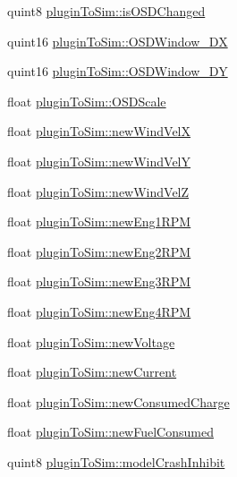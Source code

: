 \begin{DoxyCompactItemize}
\item 
quint8 \hyperlink{group___aero_sim_r_c_gaa416deb314c63406b7320311d1cf71d7}{plugin\-To\-Sim\-::is\-O\-S\-D\-Changed}
\item 
quint16 \hyperlink{group___aero_sim_r_c_gafd433a8e475af009c6214cddba668878}{plugin\-To\-Sim\-::\-O\-S\-D\-Window\-\_\-\-D\-X}
\item 
quint16 \hyperlink{group___aero_sim_r_c_gab8199d2a82d29980a0ec47ad7fced1e1}{plugin\-To\-Sim\-::\-O\-S\-D\-Window\-\_\-\-D\-Y}
\item 
float \hyperlink{group___aero_sim_r_c_ga96db301b2cf97e19ccd774f1b93dad21}{plugin\-To\-Sim\-::\-O\-S\-D\-Scale}
\item 
float \hyperlink{group___aero_sim_r_c_ga894c4529647383039436d227ab09ea6d}{plugin\-To\-Sim\-::new\-Wind\-Vel\-X}
\item 
float \hyperlink{group___aero_sim_r_c_gaf7648b2c6048cddf0ba9fb68dfb55492}{plugin\-To\-Sim\-::new\-Wind\-Vel\-Y}
\item 
float \hyperlink{group___aero_sim_r_c_gaa84a637360a4648e08d41632fb8f38c0}{plugin\-To\-Sim\-::new\-Wind\-Vel\-Z}
\item 
float \hyperlink{group___aero_sim_r_c_ga8e41974881d85220a22aa7b1e10a6c8b}{plugin\-To\-Sim\-::new\-Eng1\-R\-P\-M}
\item 
float \hyperlink{group___aero_sim_r_c_gaf9f1bbadaada97aec5a72a47799dbb69}{plugin\-To\-Sim\-::new\-Eng2\-R\-P\-M}
\item 
float \hyperlink{group___aero_sim_r_c_ga1c7f49c14ce7325e93375b1973f36b91}{plugin\-To\-Sim\-::new\-Eng3\-R\-P\-M}
\item 
float \hyperlink{group___aero_sim_r_c_ga474540a6a0a35ece5e87974e07c99c87}{plugin\-To\-Sim\-::new\-Eng4\-R\-P\-M}
\item 
float \hyperlink{group___aero_sim_r_c_ga6a11d71df14bc0a5867c993a47da8f0f}{plugin\-To\-Sim\-::new\-Voltage}
\item 
float \hyperlink{group___aero_sim_r_c_ga7fd515830d601c3785dadd02ed64dcc0}{plugin\-To\-Sim\-::new\-Current}
\item 
float \hyperlink{group___aero_sim_r_c_gabb6455cde42e82e713838307779ab4f7}{plugin\-To\-Sim\-::new\-Consumed\-Charge}
\item 
float \hyperlink{group___aero_sim_r_c_ga8a8341d7559a5dfa620a7c486f2dc023}{plugin\-To\-Sim\-::new\-Fuel\-Consumed}
\item 
quint8 \hyperlink{group___aero_sim_r_c_gac766c17be7565d11f169ec43dac2113d}{plugin\-To\-Sim\-::model\-Crash\-Inhibit}
\item 

\end{DoxyCompactItemize}
